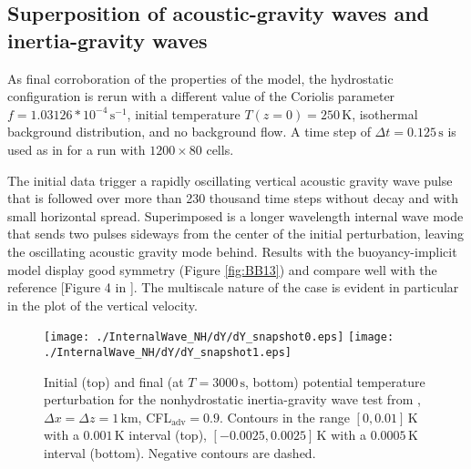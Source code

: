 \documentclass{ametsoc}
\theoremstyle{definition}
\newcommand{\dt}{\Delta t}
\begin{document}
\subsection{Superposition of acoustic-gravity waves and inertia-gravity waves}

As final corroboration of the properties of the model, the hydrostatic configuration is rerun with a different value of the Coriolis parameter $f=1.03126*10^{-4}\,\textrm{s}^{-1}$, initial temperature $T(z=0)=250\,\textrm{K}$, isothermal background distribution, and no background flow. A time step of $\dt=0.125\,\textrm{s}$ is used as in \cite{BaldaufBrdar2013} for a run with $1200\times80$ cells. 

The initial data trigger a rapidly oscillating vertical acoustic gravity wave pulse that is followed over more than 230 thousand time steps without decay and with small horizontal spread. Superimposed is a longer wavelength internal wave mode that sends two pulses sideways from the center of the initial perturbation, leaving the oscillating acoustic gravity mode behind. Results with the buoyancy-implicit model display good symmetry (Figure \ref{fig:BB13}) and compare well with the reference [Figure 4 in \cite{BaldaufBrdar2013}]. The multiscale nature of the case is evident in particular in the plot of the vertical velocity.

\begin{figure}
\centering
 \texttt{[image: ./InternalWave\_NH/dY/dY\_snapshot0.eps]}
 \texttt{[image: ./InternalWave\_NH/dY/dY\_snapshot1.eps]}
 \caption{Initial (top) and final (at $T=3000\,\textrm{s}$, bottom) potential temperature perturbation for the nonhydrostatic inertia-gravity wave test from \cite{SkamarockKlemp1994}, $\Delta x=\Delta z=1\,\textrm{km}$, CFL$_\textrm{adv}=0.9$. Contours in the range $[0, 0.01]\,\textrm{K}$ with a $0.001\,\textrm{K}$ interval (top), $[-0.0025, 0.0025]\,\textrm{K}$ with a $0.0005\,\textrm{K}$ interval (bottom). Negative contours are dashed.}
 \label{fig:SK94_NH}
\end{figure}
\end{document}
